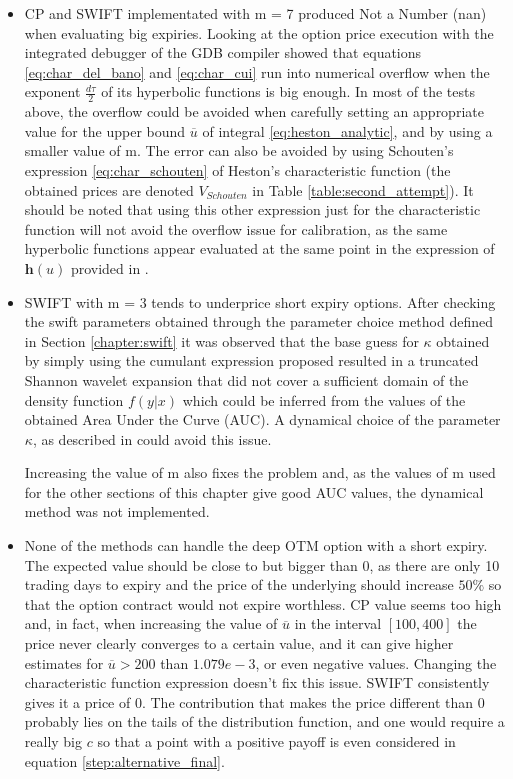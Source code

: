 \documentclass[12,twoside]{mammeTFM}
\theoremstyle{definition}
\theoremstyle{remark}
\begin{document}
\begin{itemize}
\item CP and SWIFT implementated with m = 7 produced Not a Number (nan) when evaluating big expiries. Looking at the option price execution with the integrated debugger of the GDB compiler \cite{gdb_debugger} showed that equations \ref{eq:char_del_bano} and \ref{eq:char_cui} run into numerical overflow when the exponent $\frac{d \tau}{2}$ of its hyperbolic functions is big enough. In most of the tests above, the overflow could be avoided when carefully setting an appropriate value for the upper bound $\overline{u}$ of integral \ref{eq:heston_analytic}, and by using a smaller value of m. The error can also be avoided by using Schouten's expression \ref{eq:char_schouten} of Heston's characteristic function (the obtained prices are denoted $V_{Schouten}$ in Table \ref{table:second_attempt}). It should be noted that using this other expression just for the characteristic function will not avoid the overflow issue for calibration, as the same hyperbolic functions appear evaluated at the same point in the expression of $\boldsymbol{h}(u)$ provided in \cite{cui17}.

\item SWIFT with m = 3 tends to underprice short expiry options. After checking the swift parameters obtained through the parameter choice method defined in Section \ref{chapter:swift} it was observed that the base guess for $\kappa$ obtained by simply using the cumulant expression proposed resulted in a truncated Shannon wavelet expansion that did not cover a sufficient domain of the density function $f(y | x)$ which could be inferred from the values of the obtained Area Under the Curve (AUC). A dynamical choice of the parameter $\kappa$, as described in \cite{Ortiz-Gracia2016} could avoid this issue.

Increasing the value of m also fixes the problem and, as the values of m used for the other sections of this chapter give good AUC values, the dynamical method was not implemented.

\item None of the methods can handle the deep OTM option with a short expiry. The expected value should be close to but bigger than 0, as there are only 10 trading days to expiry and the price of the underlying should increase $50\%$ so that the option contract would not expire worthless. CP value seems too high and, in fact, when increasing the value of $\overline{u}$ in the interval $[100, 400]$ the price never clearly converges to a certain value, and it can give higher estimates for $\overline{u} > 200$ than $1.079e-3$, or even negative values. Changing the characteristic function expression doesn't fix this issue. SWIFT consistently gives it a price of 0. The contribution that makes the price different than 0 probably lies on the tails of the distribution function, and one would require a really big $c$ so that a point with a positive payoff is even considered in equation \ref{step:alternative_final}.
\end{itemize}
\end{document}

